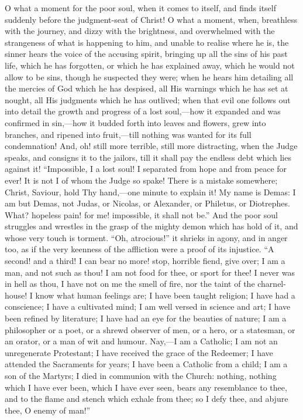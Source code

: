 O what a moment for the poor soul, when it comes to itself, and
finds itself suddenly before the judgment-seat of Christ! O what a
moment, when, breathless with the journey, and dizzy with the
brightness, and overwhelmed with the strangeness of what is happening
to him, and unable to realise where he is, the sinner hears the voice
of the accusing spirit, bringing up all the sins of his past life,
which he has forgotten, or which he has explained away, which he would
not allow to be sins, though he suspected they were; when he hears him
detailing all the mercies of God which he has despised, all His
warnings which he has set at nought, all His judgments which he has
outlived; when that evil one follows out into detail the growth and
progress of a lost soul,—how it expanded and was confirmed in sin,—how
it budded forth into leaves and flowers, grew into branches, and
ripened into fruit,—till nothing was wanted for its full
condemnation! And, oh! still more terrible, still more distracting,
when the Judge speaks, and consigns it to the jailors, till it shall
pay the endless debt which lies against it! ``Impossible, I a lost
soul! I separated from hope and from peace for ever! It is not I of
whom the Judge so spake! There is a mistake somewhere; Christ, Saviour,
hold Thy hand,—one minute to explain it! My name is Demas: I am but
Demas, not Judas, or Nicolas, or Alexander, or Philetus, or Diotrephes.
What? hopeless pain! for me! impossible, it shall not be.'' And
the poor soul struggles and wrestles in the grasp of the mighty demon
which has hold of it, and whose very touch is torment. ``Oh,
atrocious!'' it shrieks in agony, and in anger too, as if the very
keenness of the affliction were a proof of its injustice. ``A
second! and a third! I can bear no more! stop, horrible fiend, give
over; I am a man, and not such as thou! I am not food for thee, or
sport for thee! I never was in hell as thou, I have not on me the
smell of fire, nor the taint of the charnel-house! I know what human
feelings are; I have been taught religion; I have had a conscience; I
have a cultivated mind; I am well versed in science and art; I have
been refined by literature; I have had an eye for the beauties of
nature; I am a philosopher or a poet, or a shrewd observer of men, or
a hero, or a statesman, or an orator, or a man of wit and humour. Nay,—I
am a Catholic; I am not an unregenerate Protestant; I have received
the grace of the Redeemer; I have attended the Sacraments for years; I
have been a Catholic from a child; I am a son of the Martyrs; I died
in communion with the Church: nothing, nothing which I have ever been,
which I have ever seen, bears any resemblance to thee, and to the
flame and stench which exhale from thee; so I defy thee, and abjure
thee, O enemy of man!''

